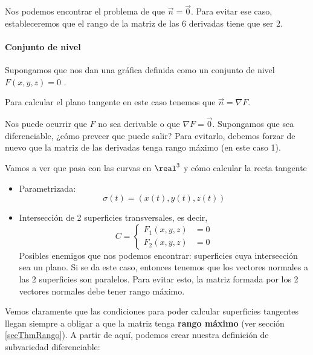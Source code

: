      Nos podemos encontrar el problema de que $\overrightarrow{n} = \overrightarrow{0}$. Para evitar ese caso, estableceremos que el rango de la matriz de las 6 derivadas tiene que ser 2.
     
   \paragraph{Conjunto de nivel} Supongamos que nos dan una gráfica definida como un conjunto de nivel $F(x,y,z) = 0$ .
   
   Para calcular el plano tangente en este caso tenemos que $\overrightarrow{n} = \nabla F$. 
   
   Nos puede ocurrir que $F$ no sea derivable o que $\nabla F = \overrightarrow{0}$. Supongamos que sea diferenciable, ¿cómo preveer que puede salir? Para evitarlo, debemos forzar de nuevo que la matriz de las derivadas tenga rango máximo (en este caso 1).
  
  Vamos a ver que pasa con las curvas en $\real^3$ y cómo calcular la recta tangente
  
  \begin{itemize}
   \item Parametrizada: \[\sigma(t) = (x(t),y(t),z(t))\]   
   \item Intersección de 2 superficies transversales, es decir,   
   \[C = \left\{\begin{array}{cc} F_1(x,y,z) &= 0\\ F_2(x,y,z) &= 0 \end{array} \right.\]   
   Posibles enemigos que nos podemos encontrar: superficies cuya intersección sea un plano. Si se da este caso, entonces tenemos que los vectores normales a las 2 superficies son paralelos. Para evitar esto, la matriz formada por los 2 vectores normales debe tener rango máximo.                                                                   
  \end{itemize}

 	Vemos claramente que las condiciones para poder calcular superficies tangentes llegan siempre a obligar a que la matriz tenga \textbf{rango máximo} (ver sección \ref{secThmRango}). A partir de aquí, podemos crear nuestra definición de subvariedad diferenciable:
  
